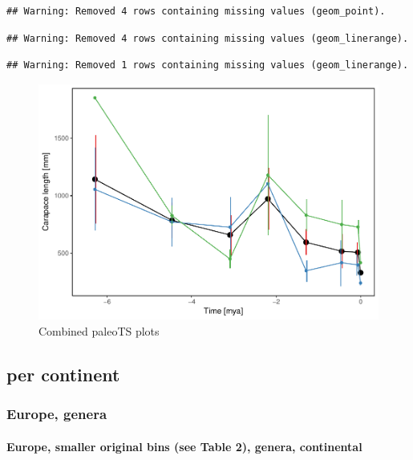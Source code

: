 \documentclass[]{article}
\let\oldparagraph\paragraph
\renewcommand{\paragraph}[1]{\oldparagraph{#1}\mbox{}}
\begin{document}
\begin{verbatim}
## Warning: Removed 4 rows containing missing values (geom_point).
\end{verbatim}

\begin{verbatim}
## Warning: Removed 4 rows containing missing values (geom_linerange).
\end{verbatim}

\begin{verbatim}
## Warning: Removed 1 rows containing missing values (geom_linerange).
\end{verbatim}

\begin{figure}[htbp]
\centering
\includegraphics{MA_JJ_files/figure-latex/paleoTScombined-3.pdf}
\caption{Combined paleoTS plots}
\end{figure}

\newpage

\subsection{per continent}\label{per-continent}

\subsubsection{Europe, genera}\label{europe-genera}

\newpage

\paragraph{Europe, smaller original bins (see Table 2), genera,
continental}\label{europe-smaller-original-bins-see-table-2-genera-continental}
\end{document}

